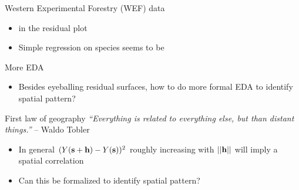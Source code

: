 \begin{frame}{Western Experimental Forestry (WEF) data}
\begin{figure}
\begin{center}
	\end{center}
\end{figure}
\pause
\begin{itemize}
	\item {} in the residual plot
	\item Simple regression on species seems to be 
\end{itemize}
\end{frame}



\begin{frame}{More EDA}
	\begin{itemize}
		\item Besides eyeballing residual surfaces, how to do more formal EDA to identify spatial pattern?
	\end{itemize}
	\pause
      \begin{exampleblock}{First law of geography}
{\em ``Everything is related to everything else, but  than distant things.''} -- Waldo Tobler
		\end{exampleblock}
	
	\pause
	\begin{itemize}
		\item In general $(Y(\textbf{s}+\textbf{h})-Y(\textbf{s}))^2$ roughly increasing with $||\textbf{h}||$ will imply a spatial correlation
		\item Can this be formalized to identify spatial pattern?
	\end{itemize}
\end{frame}

